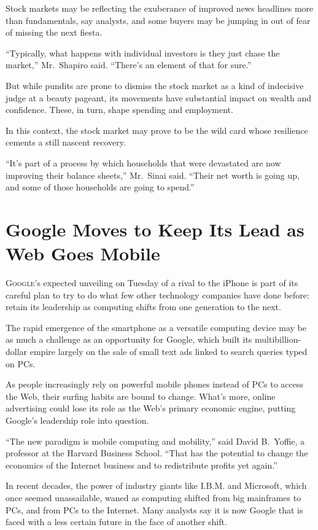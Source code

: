 ﻿\documentclass[12pt]{article}
\begin{document}
Stock markets may be reflecting the exuberance of improved news headlines more than fundamentals,
say analysts, and some buyers may be jumping in out of fear of missing the next fiesta.

``Typically, what happens with individual investors is they just chase the market,'' Mr.~Shapiro
said. ``There's an element of that for sure.''

But while pundits are prone to dismiss the stock market as a kind of indecisive judge at a beauty
pageant, its movements have substantial impact on wealth and confidence. These, in turn, shape
spending and employment.

In this context, the stock market may prove to be the wild card whose resilience cements a still
nascent recovery.

``It's part of a process by which households that were devastated are now improving their balance
sheets,'' Mr.~Sinai said. ``Their net worth is going up, and some of those households are going to
spend.''

\section{Google Moves to Keep Its Lead as Web Goes Mobile}

\lettrine{G}{oogle}'s expected unveiling on Tuesday of a rival to the iPhone
is part of its careful plan to try to do what few other technology companies have done before:
retain its leadership as computing shifts from one generation to the next.

The rapid emergence of the smartphone as a versatile computing device may be as much a challenge as
an opportunity for Google, which built its multibillion-dollar empire largely on the sale of small
text ads linked to search queries typed on PCs.

As people increasingly rely on powerful mobile phones instead of PCs to access the Web, their
surfing habits are bound to change. What's more, online advertising could lose its role as the Web's
primary economic engine, putting Google's leadership role into question.

``The new paradigm is mobile computing and mobility,'' said David B.~Yoffie, a professor at the
Harvard Business School. ``That has the potential to change the economics of the Internet business
and to redistribute profits yet again.''

In recent decades, the power of industry giants like I.B.M. and Microsoft, which once seemed
unassailable, waned as computing shifted from big mainframes to PCs, and from PCs to the Internet.
Many analysts say it is now Google that is faced with a less certain future in the face of another
shift.
\end{document}
